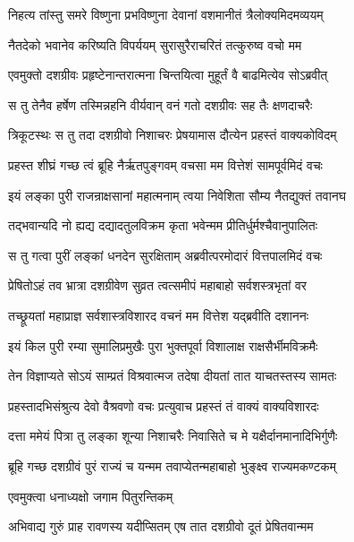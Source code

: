 \twolineshloka
{निहत्य तांस्तु समरे विष्णुना प्रभविष्णुना}
{देवानां वशमानीतं त्रैलोक्यमिदमव्ययम्} %

\twolineshloka
{नैतदेको भवानेव करिष्यति विपर्ययम्}
{सुरासुरैराचरितं तत्कुरुष्व वचो मम} %

\twolineshloka
{एवमुक्तो दशग्रीवः प्रहृष्टेनान्तरात्मना}
{चिन्तयित्वा मुहूर्तं वै बाढमित्येव सोऽब्रवीत्} %

\twolineshloka
{स तु तेनैव हर्षेण तस्मिन्नहनि वीर्यवान्}
{वनं गतो दशग्रीवः सह तैः क्षणदाचरैः} %

\twolineshloka
{त्रिकूटस्थः स तु तदा दशग्रीवो निशाचरः}
{प्रेषयामास दौत्येन प्रहस्तं वाक्यकोविदम्} %

\twolineshloka
{प्रहस्त शीघ्रं गच्छ त्वं ब्रूहि नैर्ऋतपुङ्गवम्}
{वचसा मम वित्तेशं सामपूर्वमिदं वचः} %

\twolineshloka
{इयं लङ्का पुरी राजन्राक्षसानां महात्मनाम्}
{त्वया निवेशिता सौम्य नैतद्युक्तं तवानघ} %

\twolineshloka
{तद्भवान्यदि नो ह्यद्य दद्यादतुलविक्रम}
{कृता भवेन्मम प्रीतिर्धुर्मश्चैवानुपालितः} %

\twolineshloka
{स तु गत्वा पुरीं लङ्कां धनदेन सुरक्षिताम्}
{अब्रवीत्परमोदारं वित्तपालमिदं वचः} %

\twolineshloka
{प्रेषितोऽहं तव भ्रात्रा दशग्रीवेण सुव्रत}
{त्वत्समीपं महाबाहो सर्वशस्त्रभृतां वर} %

\twolineshloka
{तच्छ्रूयतां महाप्राज्ञ सर्वशास्त्रविशारद}
{वचनं मम वित्तेश यद्ब्रवीति दशाननः} %

\twolineshloka
{इयं किल पुरी रम्या सुमालिप्रमुखैः पुरा}
{भुक्तपूर्वा विशालाक्ष राक्षसैर्भीमविक्रमैः} %

\twolineshloka
{तेन विज्ञाप्यते सोऽयं साम्प्रतं विश्रवात्मज}
{तदेषा दीयतां तात याचतस्तस्य सामतः} %

\twolineshloka
{प्रहस्तादभिसंश्रुत्य देवो वैश्रवणो वचः}
{प्रत्युवाच प्रहस्तं तं वाक्यं वाक्यविशारदः} %

\twolineshloka
{दत्ता ममेयं पित्रा तु लङ्का शून्या निशाचरैः}
{निवासिते च मे यक्षैर्दानमानादिभिर्गुणैः} %

\twolineshloka
{ब्रूहि गच्छ दशग्रीवं पुरं राज्यं च यन्मम}
{तवाप्येतन्महाबाहो भुङ्क्ष्व राज्यमकण्टकम्} %

\onelineshloka
{एवमुक्त्वा धनाध्यक्षो जगाम पितुरन्तिकम्} %

\twolineshloka
{अभिवाद्य गुरुं प्राह रावणस्य यदीप्सितम्}
{एष तात दशग्रीवो दूतं प्रेषितवान्मम} %

